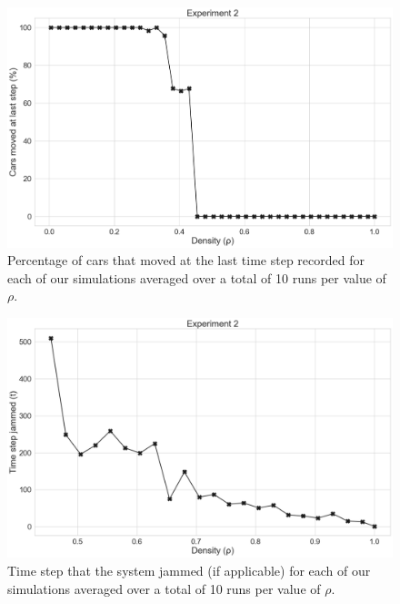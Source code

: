 \begin{figure}[H]
    \centering
    \includegraphics[width=\linewidth]{Images/Section 4/Experiment 2/2.2.pdf}
    \caption{Percentage of cars that moved at the last time step recorded for each of our simulations averaged over a total of 10 runs per value of $\rho$.}
    \label{fig:Experiment-2.2}
\end{figure}

\vspace{3em}

\begin{figure}[H]
    \centering
    \includegraphics[width=\linewidth]{Images/Section 4/Experiment 2/2.3.pdf}
    \caption{Time step that the system jammed (if applicable) for each of our simulations averaged over a total of 10 runs per value of $\rho$.}
    \label{fig:Experiment-2.3}
\end{figure}

\vfill\null

